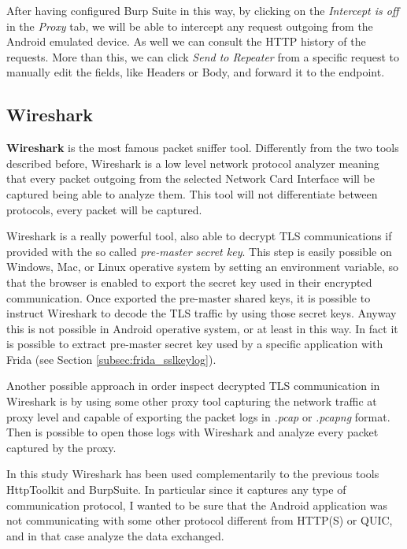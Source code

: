 			\par After having configured Burp Suite in this way, by clicking on the \textit{Intercept is off} in the \textit{Proxy} tab, we will be able to intercept any request outgoing from the Android emulated device. As well we can consult the HTTP history of the requests. More than this, we can click \textit{Send to Repeater} from a specific request to manually edit the fields, like Headers or Body, and forward it to the endpoint.
		
		\subsection{Wireshark}
		\label{sec:wireshark}
			\par \textbf{Wireshark} is the most famous packet sniffer tool. Differently from the two tools described before, Wireshark is a low level network protocol analyzer meaning that every packet outgoing from the selected Network Card Interface will be captured being able to analyze them. This tool will not differentiate between protocols, every packet will be captured. \newline
			\par Wireshark is a really powerful tool, also able to decrypt TLS communications if provided with the so called \textit{pre-master secret key}. This step is easily possible on Windows, Mac, or Linux operative system by setting an environment variable, so that the browser is enabled to export the secret key used in their encrypted communication. Once exported the pre-master shared keys, it is possible to instruct Wireshark to decode the TLS traffic by using those secret keys. Anyway this is not possible in Android operative system, or at least in this way. In fact it is possible to extract pre-master secret key used by a specific application with Frida (see Section \ref{subsec:frida_sslkeylog}).\newline
			\par Another possible approach in order inspect decrypted TLS communication in Wireshark is by using some other proxy tool capturing the network traffic at proxy level and capable of exporting the packet logs in \textit{.pcap} or \textit{.pcapng} format. Then is possible to open those logs with Wireshark and analyze every packet captured by the proxy.
			\par In this study Wireshark has been used complementarily to the previous tools HttpToolkit and BurpSuite. In particular since it captures any type of communication protocol, I wanted to be sure that the Android application was not communicating with some other protocol different from HTTP(S) or QUIC, and in that case analyze the data exchanged.
	
